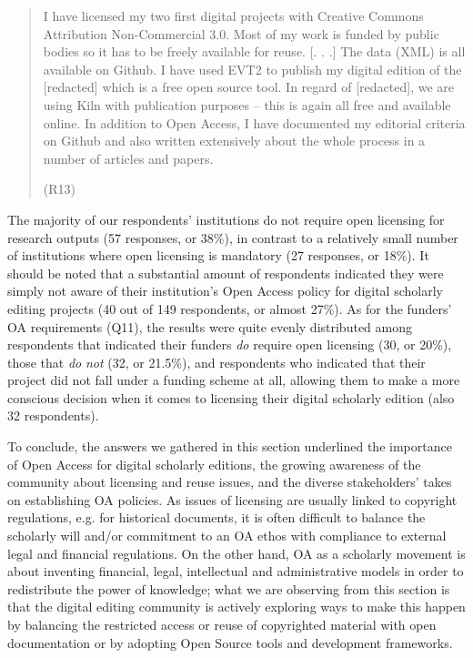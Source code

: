 \begin{paper}
\begin{quote}
I have licensed my two first digital projects with Creative Commons
Attribution Non-Commercial 3.0. Most of my work is funded by public
bodies so it has to be freely available for reuse. {[}. . .{]} The data
(XML) is all available on Github. I have used EVT2 to publish my digital
edition of the {[}redacted{]} which is a free open source tool. In
regard of {[}redacted{]}, we are using Kiln with publication purposes --
this is again all free and available online. In addition to Open Access,
I have documented my editorial criteria on Github and also written
extensively about the whole process in a number of articles and papers.
\begin{flushright}
(R13)
\end{flushright}
\end{quote}

The majority of our respondents' institutions do not require open
licensing for research outputs (57 responses, or 38\%), in contrast to a
relatively small number of institutions where open licensing is
mandatory (27 responses, or 18\%). It should be noted that a substantial
amount of respondents indicated they were simply not aware of their
institution's Open Access policy for digital scholarly editing projects
(40 out of 149 respondents, or almost 27\%). As for the funders' OA
requirements (Q11), the results were quite evenly distributed among
respondents that indicated their funders \emph{do} require open
licensing (30, or 20\%), those that \emph{do} \emph{not} (32, or
21.5\%), and respondents who indicated that their project did not fall
under a funding scheme at all, allowing them to make a more conscious
decision when it comes to licensing their digital scholarly edition
(also 32 respondents).

To conclude, the answers we gathered in this section underlined the
importance of Open Access for digital scholarly editions, the growing
awareness of the community about licensing and reuse issues, and the
diverse stakeholders' takes on establishing OA policies. As issues of
licensing are usually linked to copyright regulations, e.g. for
historical documents, it is often difficult to balance the scholarly
will and/or commitment to an OA ethos with compliance to external legal
and financial regulations. On the other hand, OA as a scholarly movement
is about inventing financial, legal, intellectual and administrative
models in order to redistribute the power of knowledge; what we are
observing from this section is that the digital editing community is
actively exploring ways to make this happen by balancing the restricted
access or reuse of copyrighted material with open documentation or by
adopting Open Source tools and development frameworks.


\end{paper}
